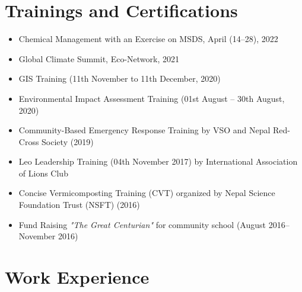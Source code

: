 \documentclass[a4paper,11.5pt]{article}
\begin{document}
\section{Trainings and Certifications}
\begin{itemize}
    \item Chemical Management with an Exercise on MSDS, April (14--28), 2022
    \item Global Climate Summit, Eco-Network, 2021
    \item GIS Training (11th November to 11th December, 2020)
    \item Environmental Impact Assessment Training (01st August -- 30th August, 2020)
    \item Community-Based Emergency Response Training by VSO and Nepal Red-Cross Society (2019)
    \item Leo Leadership Training (04th November 2017) by International Association of Lions Club
    \item Concise Vermicomposting Training (CVT) organized by Nepal Science Foundation Trust (NSFT) (2016)
    \item Fund Raising \textit{"The Great Centurian"} for community school (August 2016-- November 2016)
\end{itemize}










\section{Work Experience}
\end{document}
